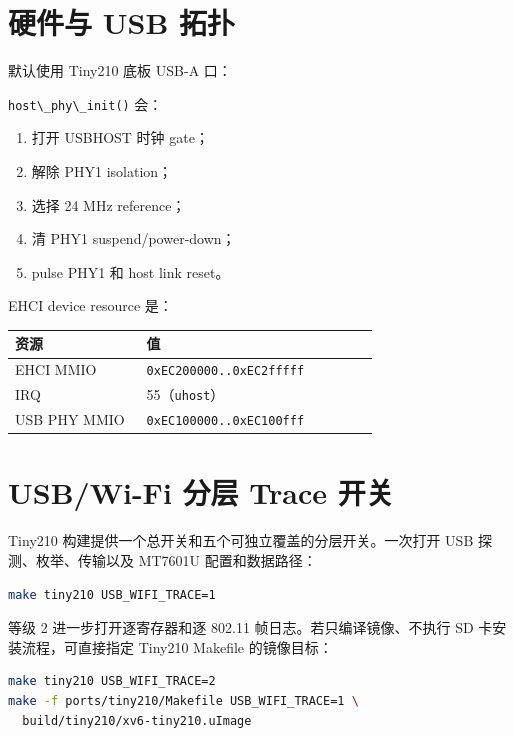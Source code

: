 \section{硬件与 USB 拓扑}\label{ux786cux4ef6ux4e0e-usb-ux62d3ux6251}

默认使用 Tiny210 底板 USB-A 口：



\passthrough{\lstinline!host\_phy\_init()!} 会：

\begin{enumerate}
\def\labelenumi{\arabic{enumi}.}
\tightlist
\item
  打开 USBHOST 时钟 gate；
\item
  解除 PHY1 isolation；
\item
  选择 24 MHz reference；
\item
  清 PHY1 suspend/power-down；
\item
  pulse PHY1 和 host link reset。
\end{enumerate}

EHCI device resource 是：

{\def\LTcaptype{none} %
\begin{longtable}[]{@{}p{0.34\linewidth}p{0.60\linewidth}@{}}
\toprule\noalign{}
资源 & 值 \\
\midrule\noalign{}
\endhead
\bottomrule\noalign{}
\endlastfoot
EHCI MMIO & \passthrough{\lstinline!0xEC200000..0xEC2fffff!} \\
IRQ & 55（\passthrough{\lstinline!uhost!}） \\
USB PHY MMIO & \passthrough{\lstinline!0xEC100000..0xEC100fff!} \\
\end{longtable}
}

\section{USB/Wi-Fi 分层 Trace 开关}\label{tiny210-wifi-trace}

Tiny210 构建提供一个总开关和五个可独立覆盖的分层开关。一次打开 USB
探测、枚举、传输以及 MT7601U 配置和数据路径：

\begin{lstlisting}[language=sh]
make tiny210 USB_WIFI_TRACE=1
\end{lstlisting}

等级 2 进一步打开逐寄存器和逐 802.11 帧日志。若只编译镜像、不执行 SD
卡安装流程，可直接指定 Tiny210 Makefile 的镜像目标：

\begin{lstlisting}[language=sh]
make tiny210 USB_WIFI_TRACE=2
make -f ports/tiny210/Makefile USB_WIFI_TRACE=1 \
  build/tiny210/xv6-tiny210.uImage
\end{lstlisting}

